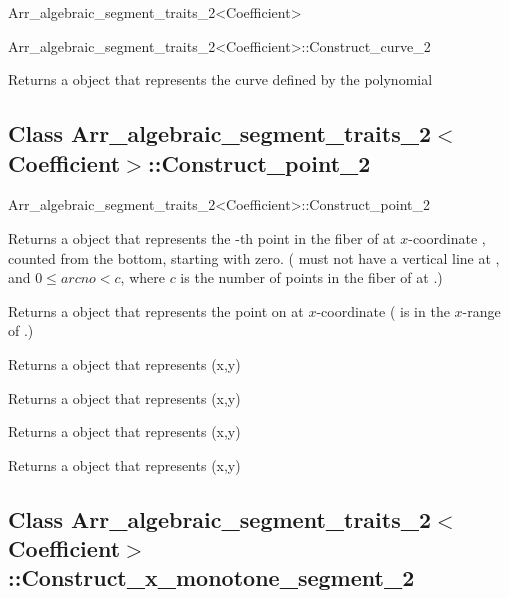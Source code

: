 \begin{ccRefClass}{Arr_algebraic_segment_traits_2<Coefficient>}
\begin{ccClass}{Arr_algebraic_segment_traits_2<Coefficient>::Construct_curve_2}

        {Returns a  object that represents the curve defined by
         the polynomial } 


\end{ccClass}

\subsection*{Class 
Arr\_algebraic\_segment\_traits\_2$<$Coefficient$>$::Construct\_point\_2}

\begin{ccClass}{Arr_algebraic_segment_traits_2<Coefficient>::Construct_point_2}


        {Returns a  object that represents the -th
         point in the fiber of  at $x$-coordinate , 
         counted from the bottom, starting with zero.
         \ccPrecond( must not have a vertical line at , 
                    and $0\leq arcno < c$, where $c$ is the number of points 
                     in the fiber of  at .)} 

        {Returns a  object that represents the 
         point on  at $x$-coordinate  
         \ccPrecond( is in the $x$-range of .)}

        {Returns a  object that represents (x,y)} 

        {Returns a  object that represents (x,y)} 

        {Returns a  object that represents (x,y)} 

        {Returns a  object that represents (x,y)} 

\end{ccClass}

\subsection*{Class 
Arr\_algebraic\_segment\_traits\_2$<$Coefficient$>$::Construct\_x\_monotone\_segment\_2}


\end{ccRefClass}
